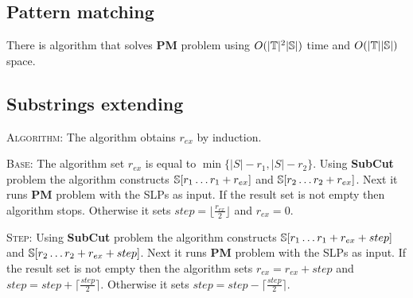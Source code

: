 ﻿\documentclass[11pt]{article}
\begin{document}
\subsection{Pattern matching}


\begin{thm}[{\rm\cite{15}}]
There is algorithm that solves \textbf{PM} problem using $O(|\mathbb{T}|^2|\mathbb{S}|)$ time and $O(|\mathbb{T}||\mathbb{S}|)$
space.
\end{thm}

\subsection{Substrings extending}


\vspace{2pt}

\noindent \textsc{Algorithm:} The algorithm obtains $r_{ex}$ by induction.

\vspace{2pt}

\noindent \textsc{Base:} The algorithm set $r_{ex}$ is equal to $\min \{|S| - r_1, |S| - r_2\}$. Using \textbf{SubCut}
problem the algorithm constructs $\mathbb{S}[r_1\dots r_1 + r_{ex}]$ and $\mathbb{S}[r_2\dots r_2 + r_{ex}]$.  Next it runs
\textbf{PM} problem with the SLPs as input. If the result set is not empty then algorithm stops. Otherwise it sets
$step = \lfloor \frac{r_{ex}}{2} \rfloor$ and $r_{ex} = 0$.

\vspace{2pt}

\noindent \textsc{Step:} Using \textbf{SubCut} problem the algorithm constructs $\mathbb{S}[r_1\dots r_1 + r_{ex} + step]$
and $\mathbb{S}[r_2\dots r_2 + r_{ex} + step]$.  Next it runs \textbf{PM} problem with the SLPs as input. If the result set
is not empty then the algorithm sets $r_{ex} = r_{ex} + step$ and $step = step + \lceil \frac{step}{2} \rceil$.
Otherwise it sets $step = step - \lceil \frac{step}{2} \rceil$.
\end{document}
